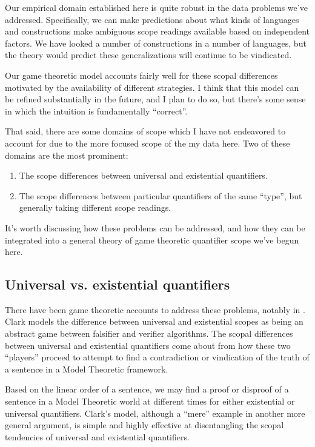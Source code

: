 \documentclass{article}
\begin{document}
Our empirical domain established here is quite robust in the data problems we've addressed.
Specifically, we can make predictions about what kinds of languages and constructions make ambiguous scope readings available based on independent factors.
We have looked a number of constructions in a number of languages, but the theory would predict these generalizations will continue to be vindicated.

Our game theoretic model accounts fairly well for these scopal differences motivated by the availability of different strategies.
I think that this model can be refined substantially in the future, and I plan to do so, but there's some sense in which the intuition is fundamentally ``correct''.

That said, there are some domains of scope which I have not endeavored to account for due to the more focused scope of the my data here.
Two of these domains are the most prominent:

\begin{enumerate}
	\item The scope differences between universal and existential quantifiers.
	\item The scope differences between particular quantifiers of the same ``type'', but generally taking different scope readings.
\end{enumerate}

It's worth discussing how these problems can be addressed, and how they can be integrated into a general theory of game theoretic quantifier scope we've begun here.

\subsection{Universal vs. existential quantifiers}

There have been game theoretic accounts to address these problems, notably in \textcite{clark12}.
Clark models the difference between universal and existential scopes as being an abstract game between falsifier and verifier algorithms.
The scopal differences between universal and existential quantifiers come about from how these two ``players'' proceed to attempt to find a contradiction or vindication of the truth of a sentence in a Model Theoretic framework.

Based on the linear order of a sentence, we may find a proof or disproof of a sentence in a Model Theoretic world at different times for either existential or universal quantifiers.
Clark's model, although a ``mere'' example in another more general argument, is simple and highly effective at disentangling the scopal tendencies of universal and existential quantifiers.
\end{document}
